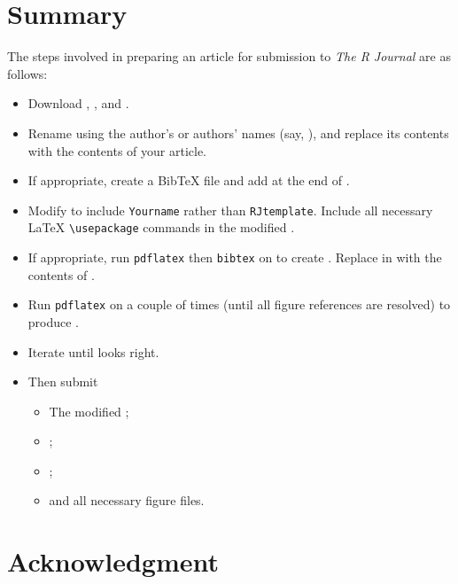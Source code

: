 \section{Summary}

The steps involved in preparing an article for submission to \emph{The R Journal}
are as follows:

\begin{itemize}

\item Download , ,
and .

\item Rename  using the author's or authors' names
(say, ), and replace its
contents with the contents of your article.

\item If appropriate, create a  BibTeX file and add
\verb|| at the end of .

\item Modify  to include {\tt Yourname} rather
than {\tt RJtemplate}. Include all necessary \LaTeX{} \verb|\usepackage|
commands in the modified .

\item If appropriate, run {\tt pdflatex} then
 {\tt bibtex} on 
to create . Replace
\verb||
in  with
the contents of .

\item Run {\tt pdflatex} on  a couple of times
(until all figure references are resolved) to produce .

\item Iterate until  looks right.

\item Then submit
  \begin{itemize}
  \item The modified ;
  \item {};
  \item {};
  \item and all necessary figure files.
  \end{itemize}
\end{itemize}

\section{Acknowledgment}

